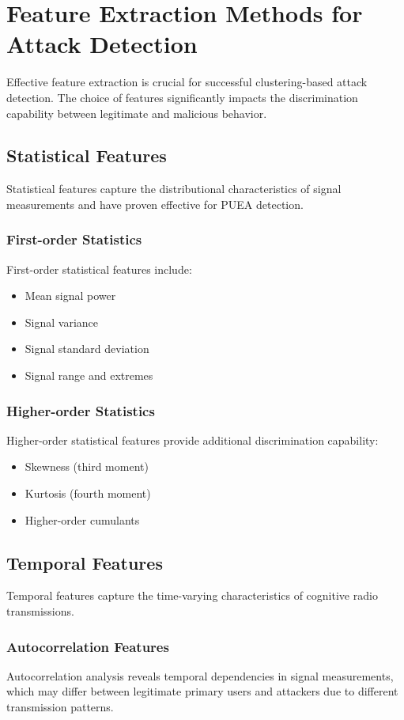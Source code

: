 \section{Feature Extraction Methods for Attack Detection}
Effective feature extraction is crucial for successful clustering-based attack detection. The choice of features significantly impacts the discrimination capability between legitimate and malicious behavior.

\subsection{Statistical Features}
Statistical features capture the distributional characteristics of signal measurements and have proven effective for PUEA detection.

\subsubsection{First-order Statistics}
First-order statistical features include:
\begin{itemize}
\item Mean signal power
\item Signal variance
\item Signal standard deviation
\item Signal range and extremes
\end{itemize}

\subsubsection{Higher-order Statistics}
Higher-order statistical features provide additional discrimination capability:
\begin{itemize}
\item Skewness (third moment)
\item Kurtosis (fourth moment)
\item Higher-order cumulants
\end{itemize}

\subsection{Temporal Features}
Temporal features capture the time-varying characteristics of cognitive radio transmissions.

\subsubsection{Autocorrelation Features}
Autocorrelation analysis reveals temporal dependencies in signal measurements, which may differ between legitimate primary users and attackers due to different transmission patterns.

